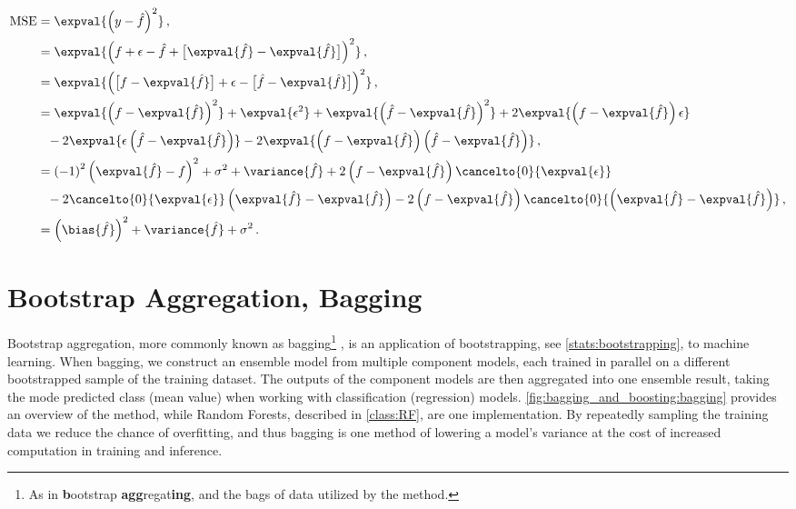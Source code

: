 \begin{subequations} \label{eq:bias_variance_tradeoff:decop}
\begin{align}
\text{MSE} &= \expval{\left(y-\hat{f}\right)^{2}}\,, \\
&= \expval{\left(f + \epsilon - \hat{f} + \big[\expval{\hat{f}}-\expval{\hat{f}}\big]\right)^{2}}\,, \\
&= \expval{\left(\big[f - \expval{\hat{f}}\big] + \epsilon - \big[\hat{f} - \expval{\hat{f}}\big]\right)^{2}}\,, \\
&= \expval{\left(f-\expval{\hat{f}}\right)^{2}}
+\expval{\epsilon^{2}}
+\expval{\left(\hat{f}-\expval{\hat{f}}\right)^{2}}
+2\expval{\left(f-\expval{\hat{f}}\right)\epsilon} \\
&\hphantom{=}-2\expval{\epsilon\left(\hat{f}-\expval{\hat{f}}\right)}
-2\expval{\left(f-\expval{\hat{f}}\right)\left(\hat{f}-\expval{\hat{f}}\right)}\,, \\
&= \left(-1\right)^{2}\left(\expval{\hat{f}}-f\right)^{2} +\sigma^{2} + \variance{\hat{f}}
+2\left(f-\expval{\hat{f}}\right)\cancelto{0}{\expval{\epsilon}} \\
&\hphantom{=}-2\cancelto{0}{\expval{\epsilon}}\left(\expval{\hat{f}}-\expval{\hat{f}}\right)
-2\left(f-\expval{\hat{f}}\right)\cancelto{0}{\left(\expval{\hat{f}}-\expval{\hat{f}}\right)}\,, \\
&= \left(\bias{\hat{f}}\right)^{2} + \variance{\hat{f}} + \sigma^{2}\,.
\end{align}
\end{subequations}

\section{Bootstrap Aggregation, \texorpdfstring{\ie}{ie} Bagging}
\label{ml_general:bagging}

Bootstrap aggregation, more commonly known as bagging\footnote{As in
\textbf{b}ootstrap \textbf{agg}regat\textbf{ing},
and the bags of data utilized by the method.} \cite{Breiman1996},
is an application of bootstrapping, see \cref{stats:bootstrapping}, to machine learning.
When bagging, we construct an ensemble model from multiple component models,
each trained in parallel on a different bootstrapped sample of the training dataset.
The outputs of the component models are then aggregated into one ensemble result,
taking the mode predicted class (mean value) when working with classification (regression) models.
\cref{fig:bagging_and_boosting:bagging} provides an overview of the method,
while Random Forests, described in \cref{class:RF}, are one implementation.
By repeatedly sampling the training data we reduce the chance of overfitting,
and thus bagging is one method of lowering a model's variance
at the cost of increased computation in training and inference.

